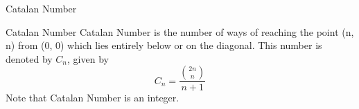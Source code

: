 \begin{frame}{Catalan Number}
    \begin{block}{Catalan Number}
        Catalan Number is the number of ways of reaching the point (n, n) from (0, 0) which lies entirely below or on the diagonal. This number is denoted by $C_n$, given by $$C_n = \frac{{2n \choose n}}{n+1}$$
        Note that Catalan Number is an integer.
    \end{block}
\end{frame}